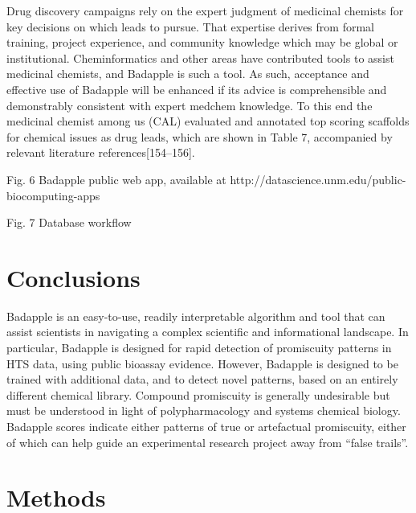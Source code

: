 Drug discovery campaigns rely on the expert judgment of medicinal chemists for key decisions on which leads to pursue. That expertise derives from formal training, project experience, and community knowledge which may be global or institutional. Cheminformatics and other areas have contributed tools to assist medicinal chemists, and Badapple is such a tool. As such, acceptance and effective use of Badapple will be enhanced if its advice is comprehensible and demonstrably consistent with expert medchem knowledge. To this end the medicinal chemist among us (CAL) evaluated and annotated top scoring scaffolds for chemical issues as drug leads, which are shown in Table 7, accompanied by relevant literature references[154–156].

Fig. 6 Badapple public web app, available at http://datascience.unm.edu/public-biocomputing-apps

Fig. 7 Database workflow

\section{Conclusions}

Badapple is an easy-to-use, readily interpretable algorithm and tool that can assist scientists in navigating a complex scientific and informational landscape. In particular, Badapple is designed for rapid detection of promiscuity patterns in HTS data, using public bioassay evidence. However, Badapple is designed to be trained with additional data, and to detect novel patterns, based on an entirely different chemical library. Compound promiscuity is generally undesirable but must be understood in light of polypharmacology and systems chemical biology. Badapple scores indicate either patterns of true or artefactual promiscuity, either of which can help guide an experimental research project away from “false trails”.

\section{Methods}

